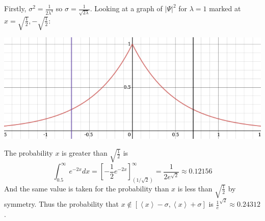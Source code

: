 \documentclass{article}
\newcommand{\braket}[1]{\left\langle #1 \right\rangle}
\begin{document}
\begin{enumerate}[label=(\alph*)]
      Firstly, $\sigma^2 = \frac1{2\lambda^4}$ so $\sigma = \frac1{\sqrt{2\lambda}}$. Looking at a graph of $|\Psi|^2$ for $\lambda = 1$ marked at $x=\sqrt{\frac12}, -\sqrt{\frac12}$:

      \centerline{\includegraphics[width=6in]{1-5c.png}}

      The probability $x$ is greater than $\sqrt{\frac12}$ is
      \[\int_{0.5}^\infty e^{-2x}dx = \left[ -\frac12e^{-2x} \right]_{(1/\sqrt{2})}^{\infty} = \frac1{2e^{\sqrt2}} \approx 0.12156 \] 
      And the same value is taken for the probability than $x$ is less than $\sqrt{\frac12}$ by symmetry.
      Thus the probability that $x \notin [\braket{x} - \sigma, \braket{x} + \sigma]$ is $\frac1e^{\sqrt{2}} \approx 0.24312$.
  \end{enumerate}
\end{document}
